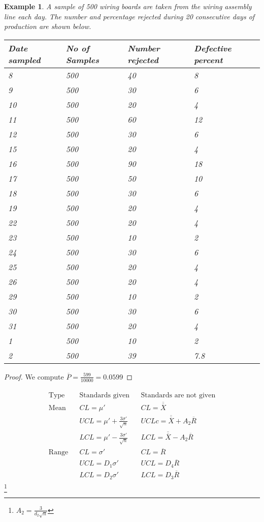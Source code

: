 \documentclass[oneside,11pt,pdftex]{book}%
\numberwithin{equation}{section}
\newtheorem{example}[theorem]{Example}
\numberwithin{section}{chapter}
\numberwithin{equation}{chapter}
\begin{document}
\begin{example}
	A sample of 500 wiring boards are taken from the wiring assembly line each day. The number and percentage rejected during 20 consecutive days of production are shown below.
	\begin{table}[!htp]
		\centering
		\begin{tabular}{@{}llll@{}}
			\toprule
			Date sampled & No of Samples & Number rejected & Defective percent \\ \midrule
			8 & 500 & 40 & 8 \\
			9 & 500 & 30 & 6 \\
			10 & 500 & 20 & 4 \\
			11 & 500 & 60 & 12 \\
			12 & 500 & 30 & 6 \\
			15 & 500 & 20 & 4 \\
			16 & 500 & 90 & 18 \\
			17 & 500 & 50 & 10 \\
			18 & 500 & 30 & 6 \\
			19 & 500 & 20 & 4 \\
			22 & 500 & 20 & 4 \\
			23 & 500 & 10 & 2 \\
			24 & 500 & 30 & 6 \\
			25 & 500 & 20 & 4 \\
			26 & 500 & 20 & 4 \\
			29 & 500 & 10 & 2 \\
			30 & 500 & 30 & 6 \\
			31 & 500 & 20 & 4 \\
			1 & 500 & 10 & 2 \\
			2 & 500 & 39 & 7.8 \\ \bottomrule
		\end{tabular}
	\end{table}
\end{example}
\begin{proof}
	We compute $ \overline{P} =\frac{599}{10000}=0.0599$
\end{proof}

\begin{align*}
	\begin{matrix}
		\text{Type} && \text{Standards given} && \text{Standards are not given}\\
		\text{Mean} && CL= \mu' && CL=\overline{\overline{X}}\\
		 && UCL=\mu'+\frac{3 \sigma'}{\sqrt{n}} && UCLc = \overline{\overline{X}}+A_2 \overline{R}\\
		 && LCL = \mu'-\frac{3 \sigma'}{\sqrt{n}} && LCL = \overline{\overline{X}}-A_2 \overline{R}\\
		 \text{Range} && CL=\sigma' && CL= \overline{R}\\
		 && UCL = D_1 \sigma' && UCL=D_4 \overline{R}\\
		 && LCL=D_2 \sigma' && LCL=D_3 \overline{R}
	\end{matrix}
\end{align*}\footnote{$ A_2=\frac{3}{d_2\sqrt{n}} $}
\end{document}
